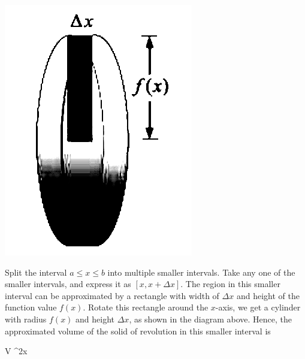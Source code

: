 \begin{center}
    \includegraphics[scale=0.3]{assets/28-22b.png}
\end{center}
Split the interval $a \leq x \leq b$ into multiple smaller intervals. Take any
one of the smaller intervals, and express it as $[x, x + \Delta x]$. The region
in this smaller interval can be approximated by a rectangle with width of
$\Delta x$ and height of the function value $f(x)$. Rotate this rectangle
around the $x$-axis, we get a cylinder with radius $f(x)$ and height $\Delta
    x$, as shown in the diagram above. Hence, the approximated volume of the solid
of revolution in this smaller interval is
\begin{cequation}
    \Delta V \approx \pi[f(x)]^2\Delta x
\end{cequation}

